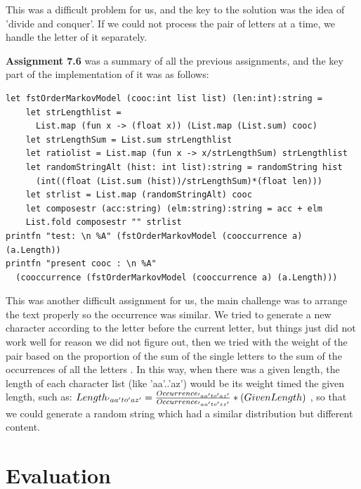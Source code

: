 \documentclass{article}
\begin{document}
This was a difficult problem for us, and the key to the solution was the idea of 'divide and conquer'. If we could not process the pair of letters at a time, we handle the letter of it separately.

\textbf{Assignment 7.6} was a summary of all the previous assignments, and the key part of the implementation of it was as follows:
\begin{lstlisting}
let fstOrderMarkovModel (cooc:int list list) (len:int):string =
    let strLengthlist = 
      List.map (fun x -> (float x)) (List.map (List.sum) cooc)
    let strLengthSum = List.sum strLengthlist
    let ratiolist = List.map (fun x -> x/strLengthSum) strLengthlist
    let randomStringAlt (hist: int list):string = randomString hist 
      (int((float (List.sum (hist))/strLengthSum)*(float len)))
    let strlist = List.map (randomStringAlt) cooc
    let composestr (acc:string) (elm:string):string = acc + elm
    List.fold composestr "" strlist
printfn "test: \n %A" (fstOrderMarkovModel (cooccurrence a) (a.Length))
printfn "present cooc : \n %A" 
  (cooccurrence (fstOrderMarkovModel (cooccurrence a) (a.Length)))
\end{lstlisting}

This was another difficult assignment for us, the main challenge was to arrange the text properly so the occurrence was similar. We tried to generate a new character according to the letter before the current letter, but things just did not work well for reason we did not figure out, then we tried with the weight of the pair based on the proportion of the sum of the single letters to the sum of the occurrences of all the letters
. In this way, when there was a given length, the length of each character list (like 'aa'..'az') would be its weight timed the given length, such as:
\begin{math}
$$Length_{'aa'to'az'} = \frac{Occurrence_{'aa' to 'az'}}{Occurrence_{'aa' to 'zz'}} * (Given Length)$$
\end{math}
, so that we could generate a random string which had a similar distribution but different content.

\section{Evaluation}
\end{document}
